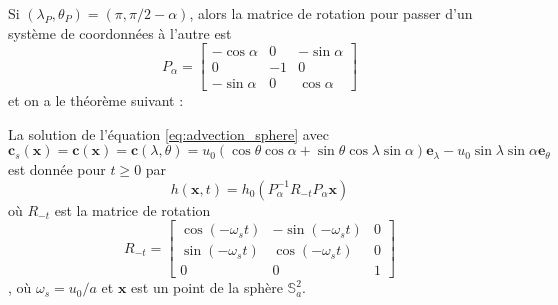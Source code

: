 Si $(\lambda_P, \theta_P) = (\pi, \pi / 2 - \alpha)$, alors la matrice de rotation pour passer d'un système de coordonnées à l'autre est
\begin{equation}
P_{\alpha} = \begin{bmatrix}
- \cos \alpha & 0 & - \sin \alpha \\
0 & -1 & 0 \\
- \sin \alpha & 0 & \cos \alpha
\end{bmatrix}
\end{equation}
et on a le théorème suivant :

\begin{theoreme}
La solution de l'équation \eqref{eq:advection_sphere} avec
\begin{equation}
\mathbf{c}_s(\mathbf{x}) = \mathbf{c}(\mathbf{x}) = \mathbf{c}(\lambda, \theta) = u_0 \left( \cos \theta \cos \alpha + \sin \theta \cos \lambda \sin \alpha \right) \mathbf{e}_{\lambda} - u_0 \sin \lambda \sin \alpha \mathbf{e}_{\theta}
\label{eq:rot_solide_1}
\end{equation}
est donnée pour $t \geq 0$ par
\begin{equation}
h(\mathbf{x}, t ) = h_0(P_{\alpha}^{-1}R_{-t}P_{\alpha} \mathbf{x})
\end{equation}
où $R_{-t}$ est la matrice de rotation
\begin{equation}
R_{-t} = \begin{bmatrix}
\cos (- \omega_s t) & - \sin (- \omega_s t) & 0 \\
\sin (- \omega_s t) & \cos (- \omega_s t)   & 0 \\
0 & 0 & 1
\end{bmatrix}
\end{equation}
, où $\omega_s = u_0/a$ et $\mathbf{x}$ est un point de la sphère $\mathbb{S}_a^2$.
\end{theoreme}

